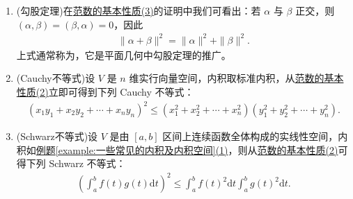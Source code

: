 \documentclass[../../main.tex]{subfiles}%
\begin{document}
\begin{corollary}\label{corollary:范数性质的相关推广}
\begin{enumerate}
\item\label{corollary:范数性质的相关推广-勾股定理} (勾股定理)在\hyperref[theorem:范数的基本性质]{范数的基本性质(3)}的证明中我们可看出：若 \(\alpha\) 与 \(\beta\) 正交，则 \((\alpha,\beta)=(\beta,\alpha)=0\)，因此
\begin{align*}
\|\alpha + \beta\|^2=\|\alpha\|^2+\|\beta\|^2.
\end{align*}
上式通常称为，它是平面几何中勾股定理的推广。

\item\label{corollary:范数性质的相关推广-Cauchy不等式} (Cauchy不等式)设 \(V\) 是 \(n\) 维实行向量空间，内积取标准内积，从\hyperref[theorem:范数的基本性质]{范数的基本性质(2)}立即可得到下列 Cauchy 不等式：
\begin{align*}
(x_1y_1 + x_2y_2+\cdots + x_ny_n)^2\leqslant (x_1^2 + x_2^2+\cdots + x_n^2)(y_1^2 + y_2^2+\cdots + y_n^2).
\end{align*}

\item\label{corollary:范数性质的相关推广-Schwarz不等式} (Schwarz不等式)设 \(V\) 是由 \([a,b]\) 区间上连续函数全体构成的实线性空间，内积如\hyperref[example:一些常见的内积及内积空间]{例题\ref{example:一些常见的内积及内积空间}(1)}，则从\hyperref[theorem:范数的基本性质]{范数的基本性质(2)}可得下列 Schwarz 不等式：
\begin{align*}
\left(\int_{a}^{b}f(t)g(t)\mathrm{d}t\right)^2\leqslant \int_{a}^{b}f(t)^2\mathrm{d}t\int_{a}^{b}g(t)^2\mathrm{d}t.
\end{align*} 
\end{enumerate}
\end{corollary}
\end{document}
